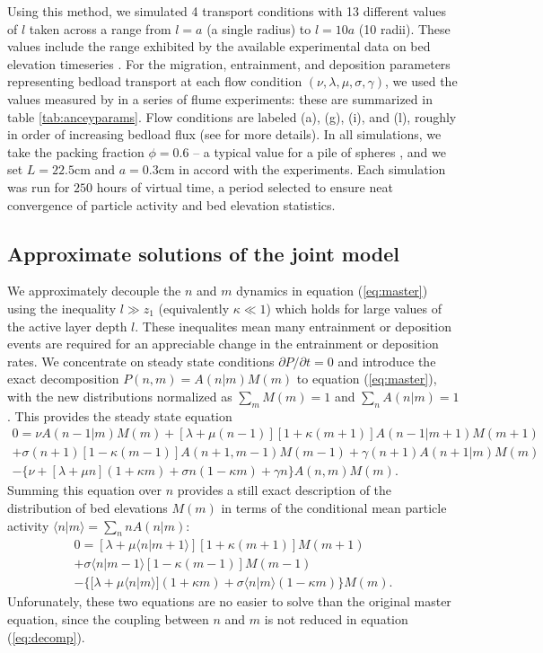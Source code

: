 Using this method, we simulated 4 transport conditions with 13 different values of $l$ taken across a range from $l=a$ (a single radius) to $l=10a$ (10 radii).
These values include the range exhibited by the available experimental data on bed elevation timeseries \citep{Wong2007,Singh2009,Martin2014}.
For the migration, entrainment, and deposition parameters representing bedload transport at each flow condition $(\nu, \lambda, \mu, \sigma, \gamma)$, we used the values measured by \citet{Ancey2008} in a series of flume experiments: these are summarized in table \ref{tab:anceyparams}.
Flow conditions are labeled (a), (g), (i), and (l), roughly in order of increasing bedload flux (see \citet{Ancey2008} for more details). 
In all simulations, we take the packing fraction $\phi = 0.6$ -- a typical value for a pile of spheres \citep[e.g.,][]{Bennett1972}, and we set $L = 22.5$cm and $a = 0.3$cm in accord with the \citet{Ancey2008} experiments.
Each simulation was run for $250$ hours of virtual time, a period selected to ensure neat convergence of particle activity and bed elevation statistics.

\subsection{Approximate solutions of the joint model}
\label{sec:analytical}

We approximately decouple the $n$ and $m$ dynamics in equation (\ref{eq:master}) using the inequality $l \gg z_1$ (equivalently $\kappa \ll 1$) which holds for large values of the active layer depth $l$. These inequalites mean many entrainment or deposition events are required for an appreciable change in the entrainment or deposition rates.
We concentrate on steady state conditions $\partial P/\partial t = 0$ and introduce the exact decomposition $P(n,m) = A(n|m)M(m)$ to equation (\ref{eq:master}), with the new distributions normalized as $\sum_m M(m)=1$ and $\sum_n A(n|m)=1$.
This provides the steady state equation
\begin{multline}
	0 =  
	\nu A(n-1|m)M(m) + [\lambda + \mu(n-1)][1+\kappa(m+1)]A(n-1|m+1)M(m+1)\\  
	+ \sigma(n+1)[1-\kappa(m-1)]A(n+1,m-1)M(m-1) + \gamma(n+1)A(n+1|m)M(m) \\
	- 
	\{ \nu + [\lambda+ \mu n ](1+\kappa m) +  \sigma n ( 1- \kappa m) + \gamma n \}A(n,m)M(m).
	\label{eq:decomp}
\end{multline}
Summing this equation over $n$ provides a still exact description of the distribution of bed elevations $M(m)$ in terms of the conditional mean particle activity $\langle n | m \rangle = \sum_{n}nA(n|m)$:
\begin{multline}
	0 =  [\lambda + \mu\langle n | m+1\rangle][1+\kappa(m+1)]M(m+1)
	\\+ \sigma\langle n | m-1\rangle[1-\kappa(m-1)]M(m-1) \\
	- 
	\{  [\lambda+ \mu \langle n | m\rangle ](1+\kappa m) +  \sigma  \langle n | m\rangle( 1- \kappa m) \}M(m).
	\label{eq:approxele}
\end{multline}
Unforunately, these two equations are no easier to solve than the original master equation, since the coupling between $n$ and $m$ is not reduced in equation (\ref{eq:decomp}).

